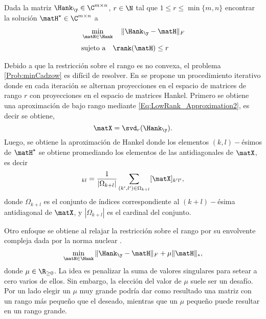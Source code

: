 	\begin{Prob}\label{Prob:minCadzow}
		Dada la matriz $\Hank_{\y}\in\C^{m\times n}$, $r\in\N$ tal que $1\le r\le \min\{m,n\}$ encontrar la solución $\matH^\star\in\C^{m\times n}$ a			
		\begin{equation}
			\begin{aligned}
				& \min_{\matH\in\Hank} \quad \|\Hank_{\y}-\matH\|_F \\[0.3em]
				& \text{sujeto a}\quad \rank(\matH)\le r
			\end{aligned}
			\label{Eq:minCadzow}
		\end{equation}
	\end{Prob}
	Debido a que la restricción sobre el rango es no convexa, el problema \eqref{Prob:minCadzow} es difícil de resolver. En \cite{Cadzow1988} se propone un procedimiento iterativo donde en cada iteración se alternan proyecciones en el espacio de matrices de rango $r$ con proyecciones en el espacio de matrices Hankel. Primero se obtiene una aproximación de bajo rango mediante \eqref{Eq:LowRank_Approximation2}, es decir se obtiene, 
	\begin{equation}
		\matX = \svd_r(\Hank_{\y}).
	\end{equation}
	Luego, se obtiene la aproximación de Hankel donde los elementos $(k,l)-$ésimos de $\matH^\star$ se obtiene promediando los elementos de las antidiagonales de $\matX$, es decir
	\begin{equation}
		[\matH^\star]_{kl} = \frac{1}{|\Omega_{k+l}|}\sum_{(k',l')\in\Omega_{k+l}}[\matX]_{k'l'},
		\label{Eq:HankelProjection}
	\end{equation}
	donde $\Omega_{k+l}$ es el conjunto de índices correspondiente al $(k+l)-$ésima antidiagonal de $\matX$, y $|\Omega_{k+l}|$ es el cardinal del conjunto.		


	Otro enfoque se obtiene al relajar la restricción sobre el rango por su envolvente compleja dada por la norma nuclear \cite{Fazel2001,Recht2010}.	
	\begin{equation}
		\min_{\matH\in\Hank} \|\Hank_{\y}-\matH\|_F + \mu\|\matH\|_*,
		\label{Eq:minNuclear}
	\end{equation}
	donde $\mu\in\R_{\geq 0}$. La idea es penalizar la suma de valores singulares para setear a cero varios de ellos. Sin embargo, la elección del valor de $\mu$ suele ser un desafío. Por un lado elegir un $\mu$ muy grande podría dar como resultado una matriz con un rango más pequeño que el deseado, mientras que un $\mu$ pequeño puede resultar en un rango grande.

